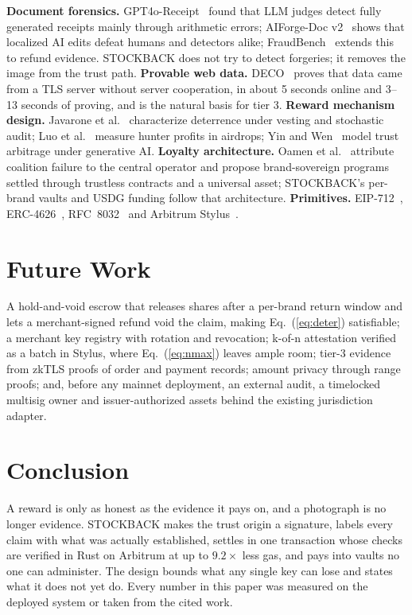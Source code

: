 \documentclass[10.5pt,letterpaper]{article}
\theoremstyle{definition}
\theoremstyle{remark}
\begin{document}
\textbf{Document forensics.} GPT4o-Receipt~\cite{zhang2026receipt} found that LLM judges detect fully generated receipts mainly through arithmetic
errors; AIForge-Doc v2~\cite{wu2026forger} shows that localized AI edits defeat humans and detectors alike; FraudBench~\cite{yan2026fraudbench} extends
this to refund evidence. STOCKBACK does not try to detect forgeries; it removes the image from the trust path.
\textbf{Provable web data.} DECO~\cite{zhang2020deco} proves that data came from a TLS server without server cooperation, in about 5 seconds online
and 3--13 seconds of proving, and is the natural basis for tier 3. \textbf{Reward mechanism design.} Javarone et al.~\cite{javarone2026nft} characterize
deterrence under vesting and stochastic audit; Luo et al.~\cite{luo2025airdrop} measure hunter profits in airdrops; Yin and Wen~\cite{yin2026trust} model trust
arbitrage under generative AI. \textbf{Loyalty architecture.} Oamen et al.~\cite{oamen2025rewards} attribute coalition failure to the central operator and
propose brand-sovereign programs settled through trustless contracts and a universal asset; STOCKBACK's per-brand vaults and USDG
funding follow that architecture. \textbf{Primitives.} EIP-712~\cite{eip712}, ERC-4626~\cite{erc4626}, RFC~8032~\cite{rfc8032} and Arbitrum Stylus~\cite{stylus}.

\section{Future Work}\label{sec:future}
A hold-and-void escrow that releases shares after a per-brand return window and lets a merchant-signed refund void the claim,
making Eq.~(\ref{eq:deter}) satisfiable; a merchant key registry with rotation and revocation; k-of-n attestation verified as a
batch in Stylus, where Eq.~(\ref{eq:nmax}) leaves ample room; tier-3 evidence from zkTLS proofs of order and payment records;
amount privacy through range proofs; and, before any mainnet deployment, an external audit, a timelocked multisig owner and
issuer-authorized assets behind the existing jurisdiction adapter.

\section{Conclusion}
A reward is only as honest as the evidence it pays on, and a photograph is no longer evidence. STOCKBACK makes the trust origin a
signature, labels every claim with what was actually established, settles in one transaction whose checks are verified in Rust on
Arbitrum at up to $9.2\times$ less gas, and pays into vaults no one can administer. The design bounds what any single key can lose and
states what it does not yet do. Every number in this paper was measured on the deployed system or taken from the cited work.
\end{document}

